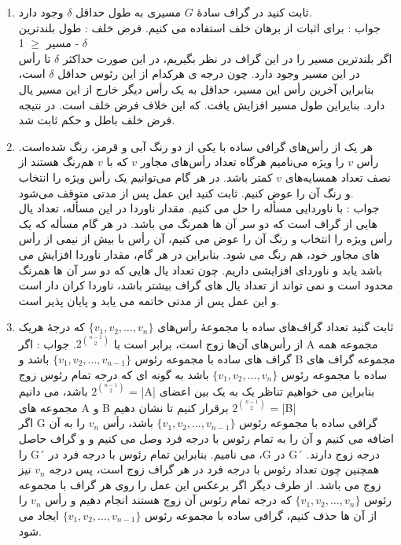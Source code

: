 \documentclass{ut}
\begin{document}
\begin{enumerate}
    \item
    ثابت کنید در گراف سادهٔ $G$ مسیری به طول حداقل $\delta$ وجود دارد.\\
    {\color{Red} جواب :}
    برای اثبات از برهان خلف استفاده می کنیم. فرض خلف : طول بلندترین مسیر $\geq$ 1 - $\delta$\\
    اگر بلندترین مسیر را در این گراف در نظر بگیریم، در این صورت حداکثر $\delta$ تا رأس‌ در این مسیر وجود دارد. چون درجه ی هرکدام از این رئوس حداقل $\delta$ است، بنابراین آخرین رأس این مسیر، حداقل به یک رأس دیگر خارج از این مسیر یال دارد. بنایراین طول مسیر افزایش یافت. که این خلاف فرض خلف است. در نتیجه فرض خلف باطل و حکم ثابت شد.
    \item
    هر یک از رأس‌های گرافی ساده با یکی از دو رنگ آبی و قرمز، رنگ شده‌است. رأس $v$ را ویژه می‌نامیم هرگاه تعداد رأس‌های مجاور $v$ که با $v$ هم‌رنگ هستند از نصف تعداد همسایه‌های $v$ کمتر باشد. در هر گام می‌توانیم یک رأس ویژه را انتخاب و رنگ آن را عوض کنیم. ثابت کنید این عمل پس از مدتی متوقف می‌شود. \\
    {\color{Red} جواب :}
	با ناوردایی مسأله را حل می کنیم. مقدار ناوردا در این مسأله، تعداد یال هایی از گراف است که دو سر آن ها همرنگ می باشد. در هر گام مسأله که یک رأس ویژه را انتخاب و رنگ آن را عوض می کنیم، آن رأس با بیش از نیمی از رأس های مجاور خود، هم رنگ می شود. بنابراین در هر گام، مقدار ناوردا افزایش می یابد و ناوردای افزایشی داریم. چون تعداد یال هایی که دو سر آن ها همرنگ ‎باشد محدود است و نمی تواند از تعداد یال های گراف بیشتر باشد، ناوردا کران دار است و این عمل پس از مدتی خاتمه می یابد و پایان پذیر است.
    \\
    \item
    ثابت گنید تعداد گراف‌های ساده با مجموعهٔ رأس‌های $\{v_{1}, v_{2}, \dots, v_{n}\}$  که درجهٔ هریک از رأس‌های آن‌ها زوج است، برابر است با $2^{{n-1}\choose{2}}$.
    {\color{Red} جواب :}
    اگر A مجموعه همه گراف های ساده با مجموعه رئوس $\{v_{1}, v_{2}, \dots, v_{n-1}\}$ باشد و B مجموعه گراف های ساده با مجموعه رئوس $\{v_{1}, v_{2}, \dots, v_{n}\}$ باشد به گونه ای که درجه تمام رئوس زوج باشد،   
    می دانیم $2^{{n-1}\choose{2}}$ = |A|
    بنابراین می خواهیم تناظر یک به یک بین اعضای مجموعه های A و B برقرار کنیم تا نشان دهیم
    $2^{{n-1}\choose{2}}$ = |B|\\
    اگر G گرافی ساده با مجموعه رئوس $\{v_{1}, v_{2}, \dots, v_{n-1}\}$ باشد، رأس $v_n$ را به آن اضافه می کنیم و آن را به تمام رئوس با درجه فرد وصل می کنیم و و گراف حاصل را G´ می نامیم. 
    بنابراین تمام رئوس با درجه فرد در ،G در G´ درجه زوج دارند. همچنین چون تعداد رئوس با درجه فرد در هر گراف زوج است، پس درجه $v_n$ نیز زوج می باشد. از طرف دیگر اگر برعکس این عمل را روی هر گراف با مجموعه رئوس $\{v_{1}, v_{2}, \dots, v_{n}\}$ که درجه تمام رئوس آن زوج هستند انجام دهیم و رأس $v_n$ را از آن ها حذف کنیم، گرافی ساده با مجموعه رئوس $\{v_{1}, v_{2}, \dots, v_{n-1}\}$ ایجاد می شود. \\

\end{enumerate}
\end{document}
